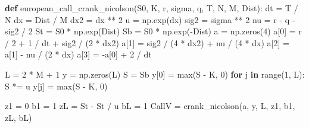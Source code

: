 \documentclass[
  letterpaper,
  DIV=11,
  numbers=noendperiod]{scrartcl}
\newenvironment{Shaded}{\begin{snugshade}}{\end{snugshade}}
\newcommand{\BuiltInTok}[1]{\textcolor[rgb]{0.00,0.23,0.31}{#1}}
\newcommand{\ControlFlowTok}[1]{\textcolor[rgb]{0.00,0.23,0.31}{\textbf{#1}}}
\newcommand{\DecValTok}[1]{\textcolor[rgb]{0.68,0.00,0.00}{#1}}
\newcommand{\KeywordTok}[1]{\textcolor[rgb]{0.00,0.23,0.31}{\textbf{#1}}}
\newcommand{\NormalTok}[1]{\textcolor[rgb]{0.00,0.23,0.31}{#1}}
\newcommand{\OperatorTok}[1]{\textcolor[rgb]{0.37,0.37,0.37}{#1}}
\theoremstyle{definition}
\theoremstyle{remark}
\begin{document}
\begin{Shaded}
\begin{Highlighting}[]
\KeywordTok{def}\NormalTok{ european\_call\_crank\_nicolson(S0, K, r, sigma, q, T, N, M, Dist):}
\NormalTok{    dt }\OperatorTok{=}\NormalTok{ T }\OperatorTok{/}\NormalTok{ N}
\NormalTok{    dx }\OperatorTok{=}\NormalTok{ Dist }\OperatorTok{/}\NormalTok{ M}
\NormalTok{    dx2 }\OperatorTok{=}\NormalTok{ dx }\OperatorTok{**} \DecValTok{2}
\NormalTok{    u }\OperatorTok{=}\NormalTok{ np.exp(dx)}
\NormalTok{    sig2 }\OperatorTok{=}\NormalTok{ sigma }\OperatorTok{**} \DecValTok{2}
\NormalTok{    nu }\OperatorTok{=}\NormalTok{ r }\OperatorTok{{-}}\NormalTok{ q }\OperatorTok{{-}}\NormalTok{ sig2 }\OperatorTok{/} \DecValTok{2}
\NormalTok{    St }\OperatorTok{=}\NormalTok{ S0 }\OperatorTok{*}\NormalTok{ np.exp(Dist)}
\NormalTok{    Sb }\OperatorTok{=}\NormalTok{ S0 }\OperatorTok{*}\NormalTok{ np.exp(}\OperatorTok{{-}}\NormalTok{Dist)}
\NormalTok{    a }\OperatorTok{=}\NormalTok{ np.zeros(}\DecValTok{4}\NormalTok{)}
\NormalTok{    a[}\DecValTok{0}\NormalTok{] }\OperatorTok{=}\NormalTok{ r }\OperatorTok{/} \DecValTok{2} \OperatorTok{+} \DecValTok{1} \OperatorTok{/}\NormalTok{ dt }\OperatorTok{+}\NormalTok{ sig2 }\OperatorTok{/}\NormalTok{ (}\DecValTok{2} \OperatorTok{*}\NormalTok{ dx2)}
\NormalTok{    a[}\DecValTok{1}\NormalTok{] }\OperatorTok{=}\NormalTok{ sig2 }\OperatorTok{/}\NormalTok{ (}\DecValTok{4} \OperatorTok{*}\NormalTok{ dx2) }\OperatorTok{+}\NormalTok{ nu }\OperatorTok{/}\NormalTok{ (}\DecValTok{4} \OperatorTok{*}\NormalTok{ dx)}
\NormalTok{    a[}\DecValTok{2}\NormalTok{] }\OperatorTok{=}\NormalTok{ a[}\DecValTok{1}\NormalTok{] }\OperatorTok{{-}}\NormalTok{ nu }\OperatorTok{/}\NormalTok{ (}\DecValTok{2} \OperatorTok{*}\NormalTok{ dx)}
\NormalTok{    a[}\DecValTok{3}\NormalTok{] }\OperatorTok{=} \OperatorTok{{-}}\NormalTok{a[}\DecValTok{0}\NormalTok{] }\OperatorTok{+} \DecValTok{2} \OperatorTok{/}\NormalTok{ dt}

\NormalTok{    L }\OperatorTok{=} \DecValTok{2} \OperatorTok{*}\NormalTok{ M }\OperatorTok{+} \DecValTok{1}
\NormalTok{    y }\OperatorTok{=}\NormalTok{ np.zeros(L)}
\NormalTok{    S }\OperatorTok{=}\NormalTok{ Sb}
\NormalTok{    y[}\DecValTok{0}\NormalTok{] }\OperatorTok{=} \BuiltInTok{max}\NormalTok{(S }\OperatorTok{{-}}\NormalTok{ K, }\DecValTok{0}\NormalTok{)}
    \ControlFlowTok{for}\NormalTok{ j }\KeywordTok{in} \BuiltInTok{range}\NormalTok{(}\DecValTok{1}\NormalTok{, L):}
\NormalTok{        S }\OperatorTok{*=}\NormalTok{ u}
\NormalTok{        y[j] }\OperatorTok{=} \BuiltInTok{max}\NormalTok{(S }\OperatorTok{{-}}\NormalTok{ K, }\DecValTok{0}\NormalTok{)}

\NormalTok{    z1 }\OperatorTok{=} \DecValTok{0}
\NormalTok{    b1 }\OperatorTok{=} \DecValTok{1}
\NormalTok{    zL }\OperatorTok{=}\NormalTok{ St }\OperatorTok{{-}}\NormalTok{ St }\OperatorTok{/}\NormalTok{ u}
\NormalTok{    bL }\OperatorTok{=} \DecValTok{1}
\NormalTok{    CallV }\OperatorTok{=}\NormalTok{ crank\_nicolson(a, y, L, z1, b1, zL, bL)}


\end{Highlighting}
\end{Shaded}
\end{document}

